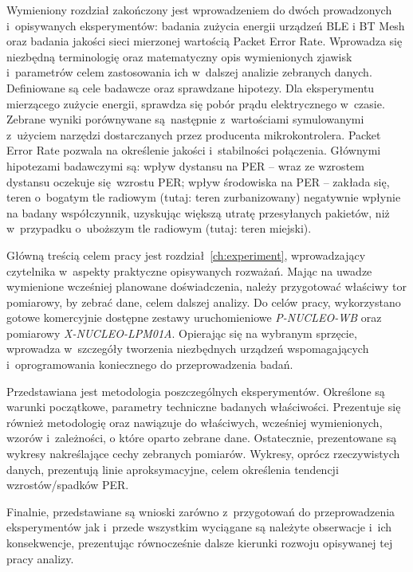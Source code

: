 Wymieniony rozdział zakończony jest wprowadzeniem do dwóch prowadzonych i~opisywanych eksperymentów:
badania zużycia energii urządzeń BLE i BT Mesh oraz badania jakości sieci mierzonej wartością
Packet Error Rate. Wprowadza się niezbędną terminologię oraz matematyczny opis wymienionych zjawisk
i~parametrów celem zastosowania ich w~dalszej analizie zebranych danych. Definiowane są cele
badawcze oraz sprawdzane hipotezy. Dla eksperymentu mierzącego zużycie energii, sprawdza się
pobór prądu elektrycznego w~czasie. Zebrane wyniki porównywane są następnie z~wartościami
symulowanymi z~użyciem narzędzi dostarczanych przez producenta mikrokontrolera.
Packet Error Rate pozwala na określenie jakości i~stabilności połączenia. Głównymi hipotezami
badawczymi są: wpływ dystansu na PER -- wraz ze wzrostem dystansu oczekuje się wzrostu PER;
wpływ środowiska na PER -- zakłada się, teren o~bogatym tle radiowym (tutaj: teren zurbanizowany)
negatywnie wpłynie na badany współczynnik, uzyskując większą utratę przesyłanych pakietów,
niż w~przypadku o~uboższym tle radiowym (tutaj: teren miejski).

Główną treścią celem pracy jest rozdział~\ref{ch:experiment}, wprowadzający czytelnika w~aspekty praktyczne opisywanych
rozważań. Mając na uwadze wymienione wcześniej planowane doświadczenia, należy przygotować właściwy tor
pomiarowy, by zebrać dane, celem dalszej analizy. Do celów pracy, wykorzystano
gotowe komercyjnie dostępne zestawy uruchomieniowe \textit{P-NUCLEO-WB} oraz pomiarowy
\textit{X-NUCLEO-LPM01A}. Opierając się na wybranym sprzęcie, wprowadza w~szczegóły
tworzenia niezbędnych urządzeń wspomagających i~oprogramowania koniecznego
do przeprowadzenia badań.

Przedstawiana jest metodologia poszczególnych eksperymentów. Określone są warunki początkowe,
parametry techniczne badanych właściwości. Prezentuje się również metodologię oraz
nawiązuje do właściwych, wcześniej wymienionych, wzorów i~zależności, o które oparto
zebrane dane. Ostatecznie, prezentowane są wykresy nakreślające cechy zebranych pomiarów.
Wykresy, oprócz rzeczywistych danych, prezentują linie aproksymacyjne, celem określenia
tendencji wzrostów/spadków PER.

Finalnie, przedstawiane są wnioski zarówno z~przygotowań do przeprowadzenia eksperymentów
jak i~przede wszystkim wyciągane są należyte obserwacje i~ich konsekwencje, prezentując równocześnie 
dalsze kierunki rozwoju opisywanej tej pracy analizy.

